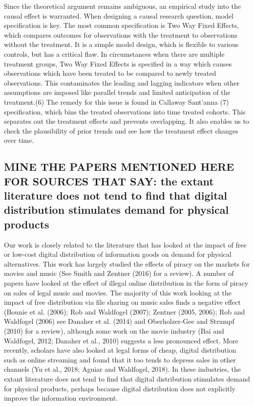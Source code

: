 \documentclass{article}
\begin{document}
Since the theoretical argument remains ambiguous, an empirical study into the causal effect is warranted. When designing a causal research question, model specification is key. The most common specification is Two Way Fixed Effects, which compares outcomes for observations with the treatment to observations without the treatment. It is a simple model design, which is flexible to various controls, but has a critical flaw. In circumstances when there are multiple treatment groups, Two Way Fixed Effects is specified in a way which causes observations which have been treated to be compared to newly treated observations. This contaminates the leading and lagging indicators when other assumptions are imposed like parallel trends and limited anticipation of the treatment.(6) The remedy for this issue is found in Callaway Sant'anna (7) specification, which bins the treated observations into time treated cohorts. This separates out the treatment effects and prevents overlapping. It also enables us to check the plausibility of prior trends and see how the treatment effect changes over time.

\subsection{MINE THE PAPERS MENTIONED HERE FOR SOURCES THAT SAY: the extant literature does not tend to find that digital distribution stimulates demand for physical products}
Our work is closely related to the literature that has looked at the impact of free or low-cost digital distribution of information goods on demand for physical alternatives. This work has largely studied the effects of piracy on the markets for movies and music (See Smith and Zentner (2016) for a review). A number of papers have looked at the effect of illegal online distribution in the form of piracy on sales of legal music and movies. The majority of this work looking at the impact of free distribution via file sharing on music sales finds a negative effect (Bounie et al. (2006); Rob and Waldfogel (2007); Zentner (2005, 2006); Rob and Waldfogel (2006) see Danaher et al. (2014) and Oberholzer-Gee and Strumpf (2010) for a review), although some work on the movie industry (Bai and Waldfogel, 2012; Danaher et al., 2010) suggests a less pronounced effect. More recently, scholars have also looked at legal forms of cheap, digital distribution such as online streaming and found that it too tends to depress sales in other channels (Yu et al., 2018; Aguiar and Waldfogel, 2018). In these industries, the extant literature does not tend to find that digital distribution stimulates demand for physical products, perhaps because digital distribution does not explicitly improve the information environment.
\end{document}
